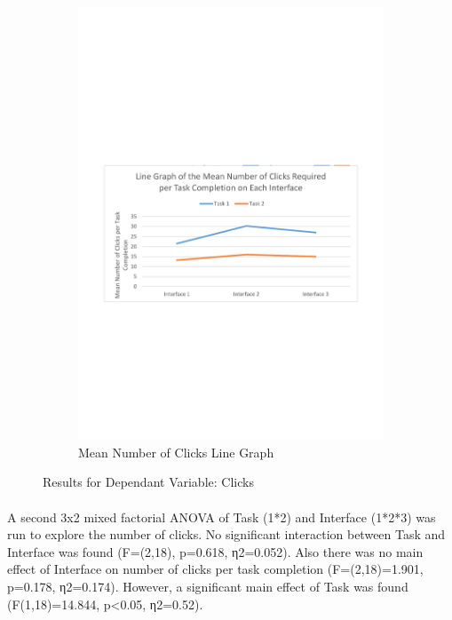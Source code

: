 \documentclass{l4proj}
\begin{document}
{\begin{figure}[H]
\begin{subfigure}{.5\textwidth}
		\includegraphics[width=\textwidth]{charts/table4.pdf}
		\caption{Mean Number of Clicks Line Graph}
		\label{ch:meanclicklinegraph}
	\end{subfigure}
	\caption{Results for Dependant Variable: Clicks}
	\label{fig:clicks}
\end{figure}
\paragraph{}
A second 3x2 mixed factorial ANOVA of Task (1*2) and Interface (1*2*3) was run to explore the number of clicks. No significant interaction between Task and Interface was found (F=(2,18), p=0.618, η2=0.052). Also there was no main effect of Interface on number of clicks per task completion (F=(2,18)=1.901, p=0.178, η2=0.174). However, a significant main effect of Task was found (F(1,18)=14.844, p<0.05, η2=0.52). 

}
\end{document}
